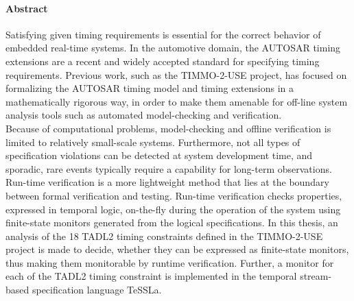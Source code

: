 
\cleardoublepage
\thispagestyle{plain}

\paragraph{Abstract}
Satisfying given timing requirements is essential for the correct behavior of embedded real-time systems.
In the automotive domain, the AUTOSAR timing extensions are a recent and widely accepted standard for specifying timing requirements.
Previous work, such as the TIMMO-2-USE project, has focused on formalizing the AUTOSAR timing model and timing extensions in a mathematically rigorous way, in order to make them amenable for off-line system analysis tools such as automated model-checking and verification.\\
Because of computational problems, model-checking and offline verification is limited to relatively small-scale systems. Furthermore, not all types of specification violations can be detected at system development time, and sporadic, rare events typically require a capability for long-term observations.
Run-time verification is a more lightweight method that lies at the boundary between formal verification and testing. Run-time verification checks properties, expressed in temporal logic, on-the-fly during the operation of the system using finite-state monitors generated from the logical specifications. 
In this thesis, an analysis of the 18 TADL2 timing constraints defined in the TIMMO-2-USE project is made to decide, whether they can be expressed as finite-state monitors, thus making them monitorable by runtime verification. Further, a monitor for each of the TADL2 timing constraint is implemented in the temporal stream-based specification language TeSSLa.

\cleardoublepage
\thispagestyle{plain}

